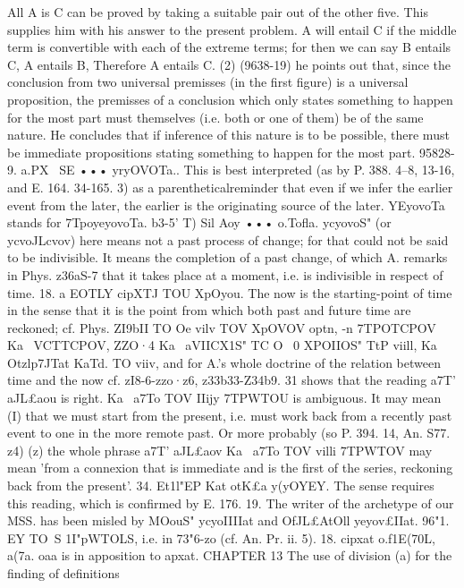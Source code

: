 {{{{{{{{{{{{{{{{{{{{{{{{{{{{{{{{{{{{{{{{{{{{{{{{{{{{{{{{{{{{{{All A is C can be proved by taking a suitable pair out of the other
five. This supplies him with his answer to the present problem.
A will entail C if the middle term is convertible with each of the
extreme terms; for then we can say B entails C, A entails B,
Therefore A entails C. (2) (9638-19) he points out that, since the
conclusion from two universal premisses (in the first figure) is
a universal proposition, the premisses of a conclusion which only
states something to happen for the most part must themselves
(i.e. both or one of them) be of the same nature. He concludes
that if inference of this nature is to be possible, there must be
immediate propositions stating something to happen for the most
part.
95828-9. a.PX~ SE ••• yryOVOTa.. This is best interpreted (as
by P. 388. 4--8, 13-16, and E. 164. 34-165. 3) as a parentheticalreminder that even if we infer the earlier event from the later,
the earlier is the originating source of the later. YEyovoTa stands
for 7TpoyeyovoTa.
b3-5' T) Sil Aoy ••• o.Tofla. ycyovoS" (or ycvoJLcvov) here means
not a past process of change; for that could not be said to be
indivisible. It means the completion of a past change, of which
A. remarks in Phys. z36aS-7 that it takes place at a moment, i.e.
is indivisible in respect of time.
18. a EOTLY cipXTJ TOU XpOyou. The now is the starting-point
of time in the sense that it is the point from which both past and
future time are reckoned; cf. Phys. ZI9bII TO Oe vilv TOV XpOVOV
opt{n, -n 7TPOTCPOV Ka~ VCTTCPOV, ZZO·4 Ka~ aVIICX1}S" TC O~ 0 XPOIIOS" TtP
viill, Ka~ Otzlp7JTat KaTd. TO viiv, and for A.'s whole doctrine of the
relation between time and the now cf. zI8-6-zzo·z6, z33b33-Z34b9.
31 shows that the reading a7T' aJL£aou is right. Ka~ a7To TOV IIijy
7TPWTOU is ambiguous. It may mean (I) that we must start from
the present, i.e. must work back from a recently past event to
one in the more remote past. Or more probably (so P. 394. 14,
An. S77. z4) (z) the whole phrase a7T' aJL£aov Ka~ a7To TOV villi 7TPWTOV
may mean 'from a connexion that is immediate and is the first
of the series, reckoning back from the present'.
34. Et1l"EP Kat otK£a y(yOYEY. The sense requires this reading,
which is confirmed by E. 176. 19. The writer of the archetype of
our MSS. has been misled by MOouS" ycyoII{IIat and OfJL£AtOll
yeyov£IIat.
96"1. EY TO~S 1I"pWTOLS, i.e. in 73"6-zo (cf. An. Pr. ii. 5).
18. cipxat o.f1E(70L, a(7a. oaa is in apposition to apxat.
CHAPTER 13
The use of division (a) for the finding of definitions
}}}}}}}}}}}}}}}}}}}}}}}}}}}}}}}}}}}}}}}}}}}}}}}}}}}}}}}}}}}}}}}
